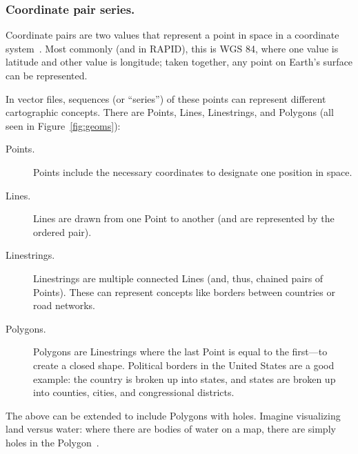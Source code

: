 \subsubsection{Coordinate pair series.}
Coordinate pairs are two values that represent a point in space in a coordinate system~\cite{gentle_intro}. Most commonly (and in RAPID), this is WGS 84, where one value is latitude and other value is longitude; taken together, any point on Earth's surface can be represented.

In vector files, sequences (or ``series'') of these points can represent different cartographic concepts. There are Points, Lines, Linestrings, and Polygons (all seen in Figure~\ref{fig:geoms}):

\begin{description}
  \item[Points.] Points include the necessary coordinates to designate one position in space.
  \item[Lines.] Lines are drawn from one Point to another (and are represented by the ordered pair).
  \item[Linestrings.] Linestrings are multiple connected Lines (and, thus, chained pairs of Points). These can represent concepts like borders between countries or road networks.
  \item[Polygons.] Polygons are Linestrings where the last Point is equal to the first---to create a closed shape. Political borders in the United States are a good example: the country is broken up into states, and states are broken up into counties, cities, and congressional districts.
\end{description}

The above can be extended to include Polygons with holes. Imagine visualizing land versus water: where there are bodies of water on a map, there are simply holes in the Polygon~\cite{gentle_intro}.

